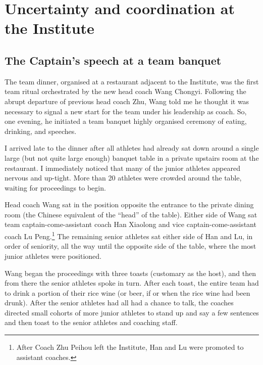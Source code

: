 \chapter{\label{chap:ethnoField} Uncertainty and coordination at the Institute}

\minitoc




\begin{CJK}{UTF8}{gbsn}



\section{The Captain's speech at a team banquet\label{sect:captainsSpeech}}

  The team dinner, organised at a restaurant adjacent to the Institute, was the first team ritual orchestrated by the new head coach Wang Chongyi. Following the abrupt departure of previous head coach Zhu, Wang told me he thought it was necessary to signal a new start for the team under his leadership as coach. So, one evening, he initiated a team banquet highly organised ceremony of eating, drinking, and speeches.

  I arrived late to the dinner after all athletes had already sat down around a single large (but not quite large enough) banquet table in a private upstairs room at the restaurant.  I immediately noticed that many of the junior athletes appeared nervous and up-tight. More than 20 athletes were crowded around the table, waiting for proceedings to begin.

  Head coach Wang sat in the position opposite the entrance to the private dining room (the Chinese equivalent of the ``head'' of the table).  Either side of Wang sat team captain-come-assistant coach Han Xiaolong and vice captain-come-assistant coach Lu Peng.\footnote{After Coach Zhu Peihou left the Institute, Han and Lu were promoted to assistant coaches.} The remaining senior athletes sat either side of Han and Lu, in order of seniority, all the way until the opposite side of the table, where the most junior athletes were positioned.

  Wang began the proceedings with three toasts (customary as the host), and then from there the senior athletes spoke in turn.  After each toast, the entire team had to drink a portion of their rice wine (or beer, if or when the rice wine had been drunk).  After the senior athletes had all had a chance to talk, the coaches directed small cohorts of more junior athletes to stand up and say a few sentences and then toast to the senior athletes and coaching staff.


\end{CJK}
